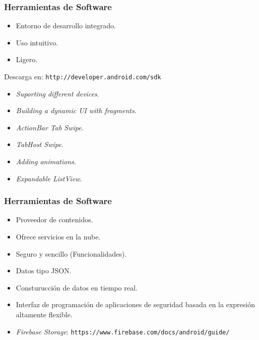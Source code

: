 \begin{frame}
	\frametitle{Herramientas de Software}
		\begin{itemize}
			\item Entorno de desarrollo integrado.
			\item Uso intuitivo.
			\item Ligero.
		\end{itemize}
		Descarga en: \texttt{http://developer.android.com/sdk}
	\endblock{}
		\begin{itemize}
			\item {\it Suporting different devices}.
			\item {\it Building a dynamic UI with fragments}.
			\item {\it ActionBar Tab Swipe}.
			\item {\it TabHost Swipe}.
			\item {\it Adding animations}.
			\item {\it Expandable ListView}.
		\end{itemize}
	\endblock{}
\end{frame}


\begin{frame}
	\frametitle{Herramientas de Software}
		\begin{itemize}
			\item Proveedor de contenidos.
			\item Ofrece servicios en la nube.
			\item Seguro y sencillo (Funcionalidades).
			\item Datos tipo JSON.
			\item Consturucción de datos en tiempo real.
			\item Interfaz de programación de aplicaciones de seguridad basada en la expresión altamente flexible.
		\end{itemize}
	\endblock{}
		\begin{itemize}
			\item {\it Firebase Storage}: {\texttt{https://www.firebase.com/docs/android/guide/}}
		\end{itemize}
	\endblock{}
\end{frame}


